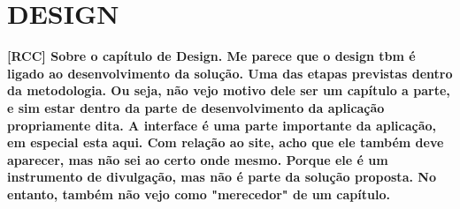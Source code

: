 


\chapter{DESIGN}\label{CAP6}

\textbf{[RCC] Sobre o capítulo de Design. Me parece que o design tbm é ligado ao desenvolvimento da solução. Uma das etapas previstas dentro da metodologia. Ou seja, não vejo motivo dele ser um capítulo a parte, e sim estar dentro da parte de desenvolvimento da aplicação propriamente dita. A interface é uma parte importante da aplicação, em especial esta aqui. Com relação ao site, acho que ele também deve aparecer, mas não sei ao certo onde mesmo. Porque ele é um instrumento de divulgação, mas não é parte da solução proposta. No entanto, também não vejo como "merecedor" de um capítulo. }

